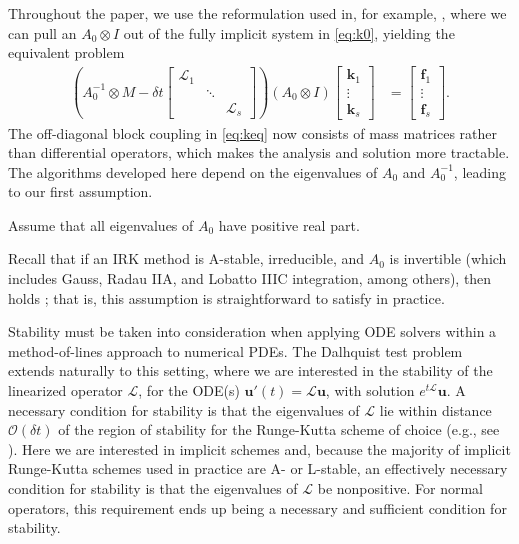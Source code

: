\documentclass[review]{siamart}
\begin{document}
Throughout the paper, we use the reformulation used in, for example,
\cite{pazner17}, where we can pull an $A_0\otimes I$ out of the
fully implicit system in \eqref{eq:k0}, yielding the equivalent problem
%
\begin{align}\label{eq:keq}
\left( A_0^{-1}\otimes M - \delta t \begin{bmatrix} \mathcal{L}_1  & \\ & \ddots \\ && \mathcal{L}_s\end{bmatrix}\right)
	(A_0\otimes I)	\begin{bmatrix} \mathbf{k}_1 \\ \vdots \\ \mathbf{k}_s \end{bmatrix}
& = \begin{bmatrix} \mathbf{f}_1 \\ \vdots \\ \mathbf{f}_s \end{bmatrix}.
\end{align}
%
The off-diagonal block coupling in \eqref{eq:keq} now consists of mass matrices
rather than differential operators, which makes the analysis and solution more
tractable.
The algorithms developed here depend on the eigenvalues of $A_0$ and
$A_0^{-1}$, leading to our first assumption.
%
\begin{assumption}\label{ass:eig}
Assume that all eigenvalues of $A_0$ have positive real part.
\end{assumption}
%
Recall that if an IRK method is A-stable, irreducible, and $A_0$ is invertible
(which includes Gauss, Radau IIA, and Lobatto IIIC integration, among others),
then  holds \cite{hairer96}; that is, this assumption is
straightforward to satisfy in practice.

Stability must be taken into consideration when applying ODE solvers within a
method-of-lines approach to numerical PDEs. The Dalhquist test problem extends
naturally to this setting, where we are interested in the stability of the
linearized operator $\mathcal{L}$, for the ODE(s)
$\mathbf{u}'(t) = \mathcal{L}\mathbf{u}$, with solution $e^{t\mathcal{L}}\mathbf{u}$.
A necessary condition for stability is that the eigenvalues of $\mathcal{L}$
lie within distance $\mathcal{O}(\delta t)$ of the region of stability for
the Runge-Kutta scheme of choice (e.g., see \cite{reddy92}). Here we are
interested in implicit schemes and, because the majority of implicit Runge-Kutta schemes
used in practice are A- or L-stable, an effectively necessary condition for
stability is that the eigenvalues of $\mathcal{L}$ be nonpositive. For
normal operators, this requirement ends up being a necessary and sufficient
condition for stability.
\end{document}
